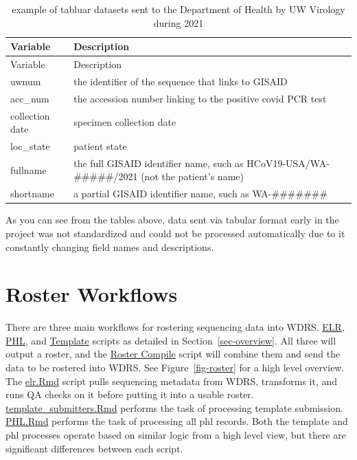 \documentclass[
]{agujournal2019}
\begin{document}
\begin{longtable}[]{@{}
  >{\raggedright\arraybackslash}p{}
  >{\raggedright\arraybackslash}p{}@{}}
\caption{example of tabluar datasets sent to the Department of Health by
UW Virology during 2021}\label{tbl-tabdata3}\tabularnewline
\toprule\noalign{}
\begin{minipage}[b]{\linewidth}\raggedright
Variable
\end{minipage} & \begin{minipage}[b]{\linewidth}\raggedright
Description
\end{minipage} \\
\midrule\noalign{}
\endfirsthead
\toprule\noalign{}
\begin{minipage}[b]{\linewidth}\raggedright
Variable
\end{minipage} & \begin{minipage}[b]{\linewidth}\raggedright
Description
\end{minipage} \\
\midrule\noalign{}
\endhead
\bottomrule\noalign{}
\endlastfoot
uwnum & the identifier of the sequence that links to GISAID \\
acc\_num & the accession number linking to the positive covid PCR
test \\
collection date & specimen collection date \\
loc\_state & patient state \\
fullname & the full GISAID identifier name, such as
HCoV19-USA/WA-\#\#\#\#\#/2021 (not the patient's name) \\
shortname & a partial GISAID identifier name, such as
WA-\#\#\#\#\#\#\# \\
\end{longtable}

As you can see from the tables above, data sent via tabular format early
in the project was not standardized and could not be processed
automatically due to it constantly changing field names and
descriptions.

\section{Roster Workflows}\label{roster-workflows}

There are three main workflows for rostering sequencing data into WDRS.
\href{@sec-elr}{ELR}, \href{@sec-phl}{PHL}, and
\href{@sec-template}{Template} scripts as detailed in
Section~\ref{sec-overview}. All three will output a roster, and the
\href{@sec-rostercompile}{Roster Compile} script will combine them and
send the data to be rostered into WDRS. See Figure~\ref{fig-roster} for
a high level overview. The \href{notebooks/elr.Rmd}{elr.Rmd} script
pulls sequencing metadata from WDRS, transforms it, and runs QA checks
on it before putting it into a usable roster.
\href{notebooks/template_submitters.Rmd}{template\_submitters.Rmd}
performs the task of processing template submission.
\href{notebooks/phl.Rmd}{PHL.Rmd} performs the task of processing all
phl records. Both the template and phl processes operate based on
similar logic from a high level view, but there are significant
differences between each script.
\end{document}

